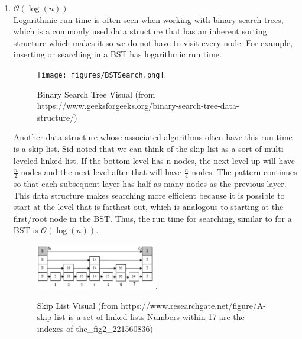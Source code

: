 \begin{enumerate}
    
    \item $\mathcal{O}(\log(n))$ \\
    Logarithmic run time is often seen when working with binary search trees, which is a commonly used data structure that has an inherent sorting structure which makes it so we do not have to visit every node. For example, inserting or searching in a BST has logarithmic run time. \\
    
    \begin{figure}[h!]
  \begin{center}
    \texttt{[image: figures/BSTSearch.png]}.
    \caption{
      Binary Search Tree Visual (from https://www.geeksforgeeks.org/binary-search-tree-data-structure/)}
    \label{fig:example_figure}
  \end{center}
\end{figure}
    
    Another data structure whose associated algorithms often have this run time is a skip list. Sid noted that we can think of the skip list as a sort of multi-leveled linked list. If the bottom level has n nodes, the next level up will have $\frac{n}{2}$ nodes and the next level after that will have $\frac{n}{4}$ nodes. The pattern continues so that each subsequent layer has half as many nodes as the previous layer. This data structure makes searching more efficient because it is possible to start at the level that is farthest out, which is analogous to starting at the first/root node in the BST. Thus, the run time for searching, similar to for a BST is $\mathcal{O}(\log(n))$. \\
    
    \begin{figure}[h!]
  \begin{center}
    \includegraphics[width=0.5\textwidth]{figures/A-skip-list-is-a-set-of-linked-lists-Numbers-within-17-are-the-indexes-of-the.png}.
    \caption{
      Skip List Visual (from https://www.researchgate.net/figure/A-skip-list-is-a-set-of-linked-lists-Numbers-within-17-are-the-indexes-of-the_fig2_221560836)}
    \label{fig:example_figure}
  \end{center}
\end{figure}


\end{enumerate}
